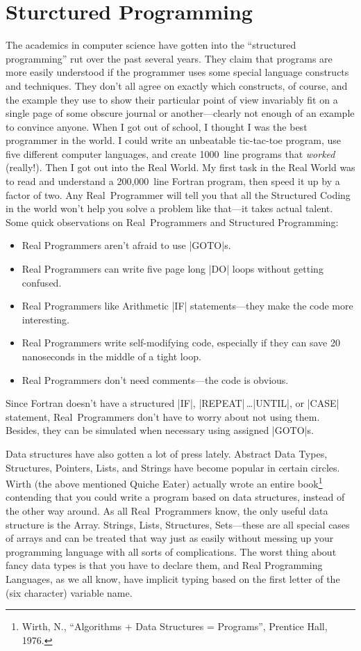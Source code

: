 \documentclass[10pt,letterpaper]{article}
\begin{document}
\section*{Sturctured Programming}
The academics in computer science have gotten into the ``structured
programming'' rut over the past several years. They claim that programs
are more easily understood if the programmer uses some special
language constructs and techniques. They don't all agree on exactly
which constructs, of course, and the example they use to show their
particular point of view invariably fit on a single page of some
obscure journal or another---clearly not enough of an example to
convince anyone. When I got out of school, I thought I was the best
programmer in the world. I could write an unbeatable tic-tac-toe
program, use five different computer languages, and create 1000~line
programs that \emph{worked} (really!). Then I got out into the Real World. My
first task in the Real World was to read and understand a 200,000~line
Fortran program, then speed it up by a factor of two. Any Real~Programmer
will tell you that all the Structured Coding in the world
won't help you solve a problem like that---it takes actual
talent. Some quick observations on Real~Programmers and Structured
Programming:
\begin{itemize}
\item Real Programmers aren't afraid to use |GOTO|s.
\item Real Programmers can write five page long |DO| loops without getting confused.
\item Real Programmers like Arithmetic |IF| statements---they make the code more interesting.
\item Real Programmers write self-modifying code, especially if they can save 20 nanoseconds in the middle of a tight loop.
\item Real Programmers don't need comments---the code is obvious.
\end{itemize}
Since Fortran doesn't have a structured |IF|, |REPEAT|\,\ldots|UNTIL|,
or |CASE| statement, Real~Programmers don't have to worry about not using
them. Besides, they can be simulated when necessary using assigned
|GOTO|s.

Data structures have also gotten a lot of press lately. Abstract Data
Types, Structures, Pointers, Lists, and Strings have become popular in
certain circles. Wirth (the above mentioned Quiche Eater) actually
wrote an entire book\footnote{Wirth, N., ``Algorithms + Data Structures = Programs'', Prentice Hall, 1976.}
contending that you could write a program
based on data structures, instead of the other way around. As all
Real~Programmers know, the only useful data structure is the
Array. Strings, Lists, Structures, Sets---these are all special cases
of arrays and can be treated that way just as easily without messing
up your programming language with all sorts of complications. The
worst thing about fancy data types is that you have to declare them,
and Real Programming Languages, as we all know, have implicit typing
based on the first letter of the (six character) variable name.
\end{document}
